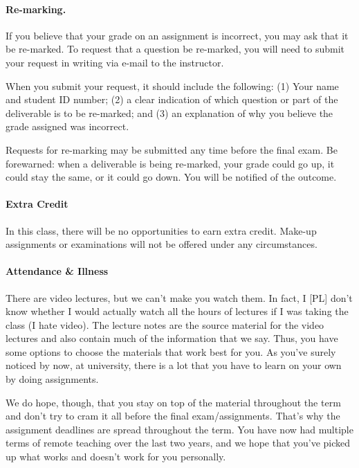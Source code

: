 \paragraph{Re-marking.}
If you believe that your grade on an assignment is incorrect, you may ask that it be re-marked. To request that a question be re-marked, you will need to submit your request in writing via e-mail to the instructor.

When you submit your request, it should include the following: (1) Your name and student ID number; (2) a clear indication of which question or part of the deliverable is to be re-marked; and (3) an explanation of why you believe the grade assigned was incorrect.

Requests for re-marking may be submitted any time before the final exam. Be forewarned: when a deliverable is being re-marked, your grade could go up, it could stay the same, or it could go down. You will be notified of the outcome.

\paragraph{Extra Credit}
In this class, there will be no opportunities to earn extra credit. Make-up assignments or examinations will not be offered under any circumstances.

\paragraph{Attendance \& Illness}

There are video lectures, but we can't make you watch them. In fact, I [PL] don't know whether I would actually watch all the hours of lectures if I was taking the class (I hate video). The lecture notes are the source material for the video lectures and also contain much of the information that we say. Thus, you have some options to choose the materials that work best for you. As you've surely noticed by now, at university, there is a lot that you have to learn on your own by doing assignments.

We do hope, though, that you stay on top of the material throughout the term and don't try to cram it all before the final exam/assignments. That's why the assignment deadlines are spread throughout the term. You have now had multiple terms of remote teaching over the last two years, and we hope that you've picked up what works and doesn't work for you personally.


